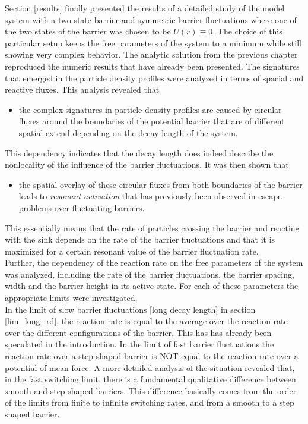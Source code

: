 Section \ref{results} finally presented the results of a detailed study of the model system with a two state barrier and symmetric barrier fluctuations where one of the two states of the barrier was chosen to be $U(r) \equiv 0$. The choice of this particular setup keeps the free parameters of the system to a minimum while still showing very complex behavior.
The analytic solution from the previous chapter reproduced the numeric results that have already been presented.  The signatures that emerged in the particle density profiles were analyzed in terms of spacial and reactive fluxes. This analysis revealed that 
\begin{itemize}
    \item the complex signatures in particle density profiles are caused by circular fluxes around the boundaries of the potential barrier that are of different spatial extend depending on the decay length of the system. 
\end{itemize}
This dependency indicates that the decay length does indeed describe the nonlocality of the influence of the barrier fluctuations. It was then shown that
\begin{itemize}
    \item the spatial overlay of these circular fluxes from both boundaries of the barrier leads to \emph{resonant activation} that has previously been observed in escape problems over fluctuating barriers.
\end{itemize}
This essentially means that the rate of particles crossing the barrier and reacting with the sink depends on the rate of the barrier fluctuations and that it is maximized for a certain resonant value of the barrier fluctuation rate. \\
Further, the dependency of the reaction rate on the free parameters of the system was analyzed, including the rate of the barrier fluctuations, the barrier spacing, width and the barrier height in its active state. For each of these parameters the appropriate limits were investigated. \\
In the limit of slow barrier fluctuations [long decay length] in section \ref{lim_long_rd}, the reaction rate is equal to the average over the reaction rate over the different configurations of the barrier. This has has already been speculated in the introduction. In the limit of fast barrier fluctuations the reaction rate over a step shaped barrier is NOT equal to the reaction rate over a potential of mean force. 
A more detailed analysis of the situation revealed that, in the fast switching limit, there is a fundamental qualitative difference between smooth and step shaped barriers. This difference basically comes from the order of the limits from finite to infinite switching rates, and from a smooth to a step shaped barrier.
